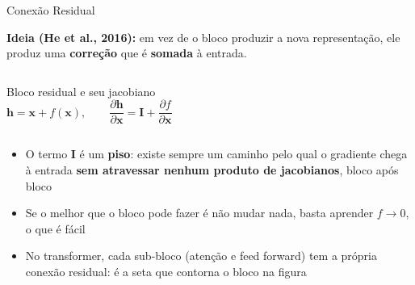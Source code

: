 \documentclass[aspectratio=169,xcolor=dvipsnames]{beamer}
\begin{document}
\begin{frame}{Conexão Residual}

\textbf{Ideia (He et al., 2016):} em vez de o bloco produzir a nova representação, ele produz uma \textbf{correção} que é \textbf{somada} à entrada.

\begin{columns}[c]
\begin{exampleblock}{Bloco residual e seu jacobiano}
\[
\mathbf{h} = \mathbf{x} + f(\mathbf{x}), \qquad
\frac{\partial \mathbf{h}}{\partial \mathbf{x}} = \mathbf{I} + \frac{\partial f}{\partial \mathbf{x}}
\]
\end{exampleblock}

\centering
{}
\end{columns}

\vspace{4pt}

\begin{itemize}
    \item O termo $\mathbf{I}$ é um \textbf{piso}: existe sempre um caminho pelo qual o gradiente chega à entrada \textbf{sem atravessar nenhum produto de jacobianos}, bloco após bloco
    \item Se o melhor que o bloco pode fazer é não mudar nada, basta aprender $f \to 0$, o que é fácil
    \item No transformer, cada sub-bloco (atenção e feed forward) tem a própria conexão residual: é a seta que contorna o bloco na figura
\end{itemize}

\end{frame}

\end{document}
